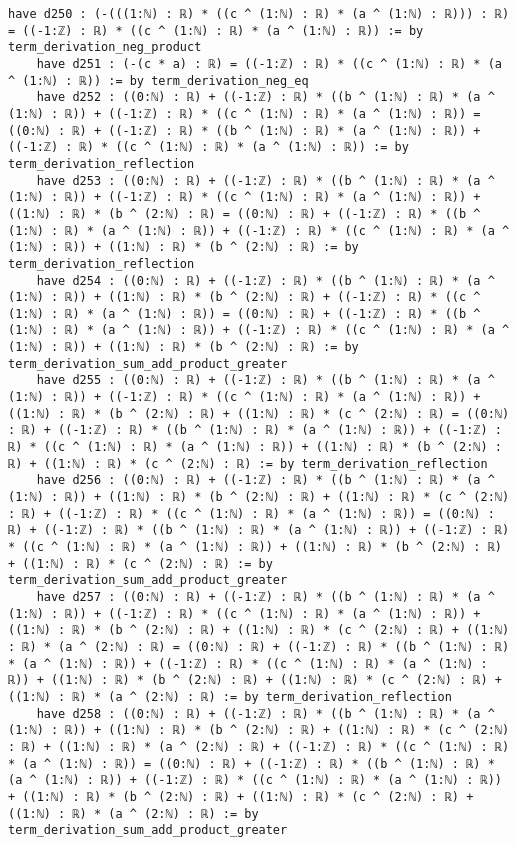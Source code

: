 \documentclass{article}
\begin{document}
\begin{tcolorbox}[colback=white!10, width=\linewidth]
\begin{lstlisting}[language=Lean4]
    have d250 : (-(((1:ℕ) : ℝ) * ((c ^ (1:ℕ) : ℝ) * (a ^ (1:ℕ) : ℝ))) : ℝ) = ((-1:ℤ) : ℝ) * ((c ^ (1:ℕ) : ℝ) * (a ^ (1:ℕ) : ℝ)) := by term_derivation_neg_product
    have d251 : (-(c * a) : ℝ) = ((-1:ℤ) : ℝ) * ((c ^ (1:ℕ) : ℝ) * (a ^ (1:ℕ) : ℝ)) := by term_derivation_neg_eq
    have d252 : ((0:ℕ) : ℝ) + ((-1:ℤ) : ℝ) * ((b ^ (1:ℕ) : ℝ) * (a ^ (1:ℕ) : ℝ)) + ((-1:ℤ) : ℝ) * ((c ^ (1:ℕ) : ℝ) * (a ^ (1:ℕ) : ℝ)) = ((0:ℕ) : ℝ) + ((-1:ℤ) : ℝ) * ((b ^ (1:ℕ) : ℝ) * (a ^ (1:ℕ) : ℝ)) + ((-1:ℤ) : ℝ) * ((c ^ (1:ℕ) : ℝ) * (a ^ (1:ℕ) : ℝ)) := by term_derivation_reflection
    have d253 : ((0:ℕ) : ℝ) + ((-1:ℤ) : ℝ) * ((b ^ (1:ℕ) : ℝ) * (a ^ (1:ℕ) : ℝ)) + ((-1:ℤ) : ℝ) * ((c ^ (1:ℕ) : ℝ) * (a ^ (1:ℕ) : ℝ)) + ((1:ℕ) : ℝ) * (b ^ (2:ℕ) : ℝ) = ((0:ℕ) : ℝ) + ((-1:ℤ) : ℝ) * ((b ^ (1:ℕ) : ℝ) * (a ^ (1:ℕ) : ℝ)) + ((-1:ℤ) : ℝ) * ((c ^ (1:ℕ) : ℝ) * (a ^ (1:ℕ) : ℝ)) + ((1:ℕ) : ℝ) * (b ^ (2:ℕ) : ℝ) := by term_derivation_reflection
    have d254 : ((0:ℕ) : ℝ) + ((-1:ℤ) : ℝ) * ((b ^ (1:ℕ) : ℝ) * (a ^ (1:ℕ) : ℝ)) + ((1:ℕ) : ℝ) * (b ^ (2:ℕ) : ℝ) + ((-1:ℤ) : ℝ) * ((c ^ (1:ℕ) : ℝ) * (a ^ (1:ℕ) : ℝ)) = ((0:ℕ) : ℝ) + ((-1:ℤ) : ℝ) * ((b ^ (1:ℕ) : ℝ) * (a ^ (1:ℕ) : ℝ)) + ((-1:ℤ) : ℝ) * ((c ^ (1:ℕ) : ℝ) * (a ^ (1:ℕ) : ℝ)) + ((1:ℕ) : ℝ) * (b ^ (2:ℕ) : ℝ) := by term_derivation_sum_add_product_greater
    have d255 : ((0:ℕ) : ℝ) + ((-1:ℤ) : ℝ) * ((b ^ (1:ℕ) : ℝ) * (a ^ (1:ℕ) : ℝ)) + ((-1:ℤ) : ℝ) * ((c ^ (1:ℕ) : ℝ) * (a ^ (1:ℕ) : ℝ)) + ((1:ℕ) : ℝ) * (b ^ (2:ℕ) : ℝ) + ((1:ℕ) : ℝ) * (c ^ (2:ℕ) : ℝ) = ((0:ℕ) : ℝ) + ((-1:ℤ) : ℝ) * ((b ^ (1:ℕ) : ℝ) * (a ^ (1:ℕ) : ℝ)) + ((-1:ℤ) : ℝ) * ((c ^ (1:ℕ) : ℝ) * (a ^ (1:ℕ) : ℝ)) + ((1:ℕ) : ℝ) * (b ^ (2:ℕ) : ℝ) + ((1:ℕ) : ℝ) * (c ^ (2:ℕ) : ℝ) := by term_derivation_reflection
    have d256 : ((0:ℕ) : ℝ) + ((-1:ℤ) : ℝ) * ((b ^ (1:ℕ) : ℝ) * (a ^ (1:ℕ) : ℝ)) + ((1:ℕ) : ℝ) * (b ^ (2:ℕ) : ℝ) + ((1:ℕ) : ℝ) * (c ^ (2:ℕ) : ℝ) + ((-1:ℤ) : ℝ) * ((c ^ (1:ℕ) : ℝ) * (a ^ (1:ℕ) : ℝ)) = ((0:ℕ) : ℝ) + ((-1:ℤ) : ℝ) * ((b ^ (1:ℕ) : ℝ) * (a ^ (1:ℕ) : ℝ)) + ((-1:ℤ) : ℝ) * ((c ^ (1:ℕ) : ℝ) * (a ^ (1:ℕ) : ℝ)) + ((1:ℕ) : ℝ) * (b ^ (2:ℕ) : ℝ) + ((1:ℕ) : ℝ) * (c ^ (2:ℕ) : ℝ) := by term_derivation_sum_add_product_greater
    have d257 : ((0:ℕ) : ℝ) + ((-1:ℤ) : ℝ) * ((b ^ (1:ℕ) : ℝ) * (a ^ (1:ℕ) : ℝ)) + ((-1:ℤ) : ℝ) * ((c ^ (1:ℕ) : ℝ) * (a ^ (1:ℕ) : ℝ)) + ((1:ℕ) : ℝ) * (b ^ (2:ℕ) : ℝ) + ((1:ℕ) : ℝ) * (c ^ (2:ℕ) : ℝ) + ((1:ℕ) : ℝ) * (a ^ (2:ℕ) : ℝ) = ((0:ℕ) : ℝ) + ((-1:ℤ) : ℝ) * ((b ^ (1:ℕ) : ℝ) * (a ^ (1:ℕ) : ℝ)) + ((-1:ℤ) : ℝ) * ((c ^ (1:ℕ) : ℝ) * (a ^ (1:ℕ) : ℝ)) + ((1:ℕ) : ℝ) * (b ^ (2:ℕ) : ℝ) + ((1:ℕ) : ℝ) * (c ^ (2:ℕ) : ℝ) + ((1:ℕ) : ℝ) * (a ^ (2:ℕ) : ℝ) := by term_derivation_reflection
    have d258 : ((0:ℕ) : ℝ) + ((-1:ℤ) : ℝ) * ((b ^ (1:ℕ) : ℝ) * (a ^ (1:ℕ) : ℝ)) + ((1:ℕ) : ℝ) * (b ^ (2:ℕ) : ℝ) + ((1:ℕ) : ℝ) * (c ^ (2:ℕ) : ℝ) + ((1:ℕ) : ℝ) * (a ^ (2:ℕ) : ℝ) + ((-1:ℤ) : ℝ) * ((c ^ (1:ℕ) : ℝ) * (a ^ (1:ℕ) : ℝ)) = ((0:ℕ) : ℝ) + ((-1:ℤ) : ℝ) * ((b ^ (1:ℕ) : ℝ) * (a ^ (1:ℕ) : ℝ)) + ((-1:ℤ) : ℝ) * ((c ^ (1:ℕ) : ℝ) * (a ^ (1:ℕ) : ℝ)) + ((1:ℕ) : ℝ) * (b ^ (2:ℕ) : ℝ) + ((1:ℕ) : ℝ) * (c ^ (2:ℕ) : ℝ) + ((1:ℕ) : ℝ) * (a ^ (2:ℕ) : ℝ) := by term_derivation_sum_add_product_greater

\end{lstlisting}
\end{tcolorbox}
\end{document}
